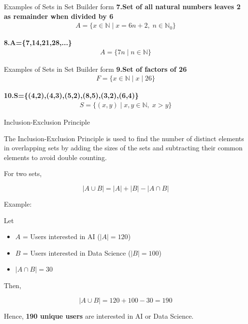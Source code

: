 \documentclass{beamer}
\begin{document}
\begin{frame}{Examples of Sets in Set Builder form}
    \textbf{7.Set of all natural numbers leaves 2 as remainder when divided by 6}
    \begin{gather*}
        A=\{x\in\mathbb{N}\mid x=6n+2,\; n\in\mathbb{N}_0\}
    \end{gather*}
    
    \vspace{0.5cm}
    
    \textbf{8.A=\{7,14,21,28,...\}}
    \begin{gather*}
        A=\{7n\mid n\in\mathbb{N}\}
    \end{gather*}
\end{frame}


\begin{frame}{Examples of Sets in Set Builder form}
    \textbf{9.Set of factors of 26}
    \begin{gather*}
        F=\{x\in\mathbb{N}\mid x\mid 26\}
    \end{gather*}
    
    \vspace{0.5cm}
    
    \textbf{10.S=\{(4,2),(4,3),(5,2),(8,5),(3,2),(6,4)\}}
    \begin{gather*}
        S=\{(x,y)\mid x,y\in\mathbb{N},\; x>y\}
    \end{gather*}
\end{frame}
\begin{frame}{Inclusion-Exclusion Principle}

\begin{block}
    
{The Inclusion-Exclusion Principle is used to find the number of distinct elements in overlapping sets by adding the sizes of the sets and subtracting their common elements to avoid double counting.}
\end{block}
For two sets,

\[
|A \cup B| = |A| + |B| - |A \cap B|
\]

\texbf Example:

Let
\begin{itemize}
    \item $A$ = Users interested in AI ($|A|=120$)
    \item $B$ = Users interested in Data Science ($|B|=100$)
    \item $|A \cap B|=30$
\end{itemize}

Then,

\[
|A \cup B|
=120+100-30
=190
\]

Hence, \textbf{190 unique users} are interested in AI or Data Science.
\end{frame}
\end{document}
